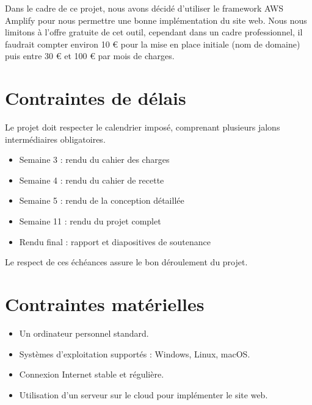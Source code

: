\documentclass[a4paper,12pt]{report}
\begin{document}
Dans le cadre de ce projet, nous avons décidé d’utiliser le framework AWS Amplify pour nous permettre une bonne implémentation du site web. Nous nous limitons à l’offre gratuite de cet outil, cependant dans un cadre professionnel, il faudrait compter environ 10 € pour la mise en place initiale (nom de domaine) puis entre 30 € et 100 € par mois de charges.



\section{Contraintes de délais}

Le projet doit respecter le calendrier imposé, comprenant plusieurs jalons intermédiaires obligatoires.

\begin{itemize}
    \item Semaine 3 : rendu du cahier des charges
    \item Semaine 4 : rendu du cahier de recette
    \item Semaine 5 : rendu de la conception détaillée
    \item Semaine 11 : rendu du projet complet
    \item Rendu final : rapport et diapositives de soutenance
\end{itemize}

 Le respect de ces échéances assure le bon déroulement du projet. 

\section{Contraintes matérielles}
\begin{itemize}
    \item Un ordinateur personnel standard.
    \item Systèmes d'exploitation supportés : Windows, Linux, macOS.
    \item Connexion Internet stable et régulière.
    \item Utilisation d'un serveur sur le cloud pour implémenter le site web.
\end{itemize}
\end{document}
